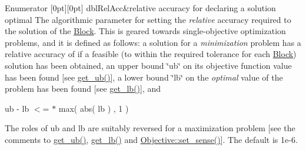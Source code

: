 \begin{DoxyEnumFields}{Enumerator}
[0pt][0pt]{}\mbox{\label{class_s_m_spp__di__unipi__it_1_1_solver_ace6215148d1e3c41a8844f6d692ee132a6bafebef661615217b94425419f0d8d2}} 
dbl\+Rel\+Acc&relative accuracy for declaring a solution optimal The algorithmic parameter for setting the {\itshape relative} accuracy required to the solution of the \mbox{\hyperlink{class_s_m_spp__di__unipi__it_1_1_block}{Block}}. This is geared towards single-\/objective optimization problems, and it is defined as follows\+: a solution for a {\itshape minimization} problem has a relative accuracy of  if a feasible (to within the required tolerance for each \mbox{\hyperlink{class_s_m_spp__di__unipi__it_1_1_block}{Block}}) solution has been obtained, an upper bound \char`\"{}ub\char`\"{} on its objective function value has been found \mbox{[}see \mbox{\hyperlink{class_s_m_spp__di__unipi__it_1_1_solver_a7304d819b2eeff3d4ba650055b24e3a5}{get\+\_\+ub()}}\mbox{]}, a lower bound \char`\"{}lb\char`\"{} on the {\itshape optimal} value of the problem has been found \mbox{[}see \mbox{\hyperlink{class_s_m_spp__di__unipi__it_1_1_solver_a4a4dbe4c2416d531c4619ca94fc07d31}{get\+\_\+lb()}}\mbox{]}, and

ub -\/ lb $<$=  $\ast$ max( abs( lb ) , 1 )

The roles of ub and lb are suitably reversed for a maximization problem \mbox{[}see the comments to \mbox{\hyperlink{class_s_m_spp__di__unipi__it_1_1_solver_a7304d819b2eeff3d4ba650055b24e3a5}{get\+\_\+ub()}}, \mbox{\hyperlink{class_s_m_spp__di__unipi__it_1_1_solver_a4a4dbe4c2416d531c4619ca94fc07d31}{get\+\_\+lb()}} and \mbox{\hyperlink{class_s_m_spp__di__unipi__it_1_1_objective_ac8a312b13d860de392750856449ef2a8}{Objective\+::set\+\_\+sense()}}\mbox{]}. The default is 1e-\/6. \\
\hline


\end{DoxyEnumFields}
